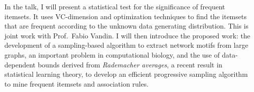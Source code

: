 \documentclass[12pt]{article}
\begin{document}
In the talk, I will present a statistical test for the significance of frequent itemsets.
It uses VC-dimension and optimization techniques to find the itemsets that are
frequent according to the unknown data generating distribution.
This is joint work with Prof.~Fabio Vandin. I will then introduce the proposed
work: the development of a sampling-based algorithm to extract network motifs
from large graphs, an important problem in computational biology, %
and the use of data-dependent bounds derived from \emph{Rademacher averages}, a
recent result in statistical learning theory, to develop an efficient
progressive sampling algorithm to mine frequent itemsets and association rules.
\end{document}
